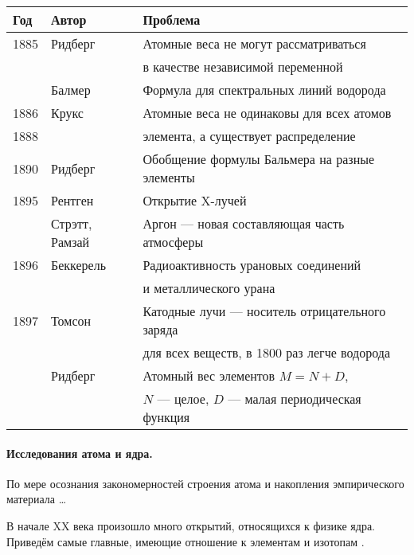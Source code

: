 \documentclass[a5paper,openany]{book}
\begin{document}
{\small	
		\begin{tabular}{l|l|l}
			Год & Автор	& Проблема \\
			\hline
			1885 & Ридберг & {\color{red}Атомные веса не могут рассматриваться} \\
			~ & ~ & {\color{red} в качестве независимой переменной} \\	
			~ & Балмер & Формула для спектральных линий водорода \\	
			1886 & Крукс & {\color{red}Атомные веса не одинаковы для всех атомов } \\
			1888 & ~ &   {\color{red}элемента, а существует распределение }\\
			1890 & Ридберг & Обобщение формулы Бальмера на разные элементы \\	
			1895 & Рентген & Открытие X-лучей \\
			~ & Стрэтт, Рамзай & Аргон --- новая составляющая часть атмосферы \\
			1896 & Беккерель & Радиоактивность урановых соединений  \\
			~ & ~ &  и металлического урана\\
			1897 & Томсон & Катодные лучи --- носитель отрицательного заряда  \\
			~ & ~ &  для всех веществ, в 1800 раз легче водорода\\	
			~ & Ридберг & {\color{red}Атомный вес элементов $M = N+D$,} \\	
			~ & ~ &  {\color{red}$N$ --- целое, $D$ --- малая периодическая функция}\\			
			\hline
		\end{tabular}
	}
	
	\paragraph{Исследования атома и ядра.} По мере осознания закономерностей строения атома и накопления эмпирического материала \ldots
	
	
	
	
	
	
	
	
	В начале XX века произошло много открытий, относящихся к физике ядра. Приведём самые главные, имеющие отношение к элементам и изотопам \cite{Bekman}.
	
\end{document}

